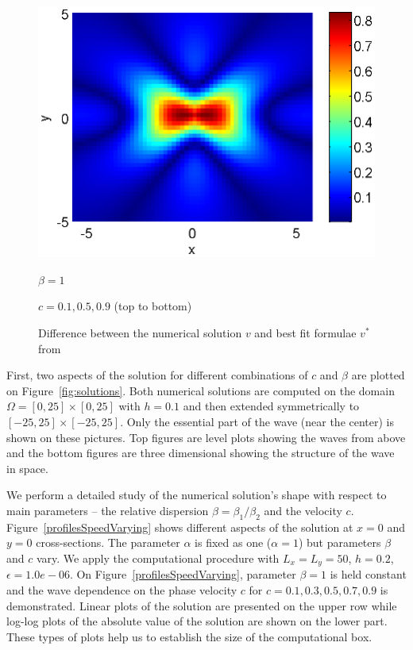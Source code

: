 \documentclass[leqno,11pt]{book}
\begin{document}
\begin{figure}[htbp]
\begin{minipage}[b]{0.48\linewidth}
		 \includegraphics[width=\linewidth]{differences/difference_c=09_beta=1.eps}
		\centerline{$\beta = 1$}
		\centerline{$c = 0.1, 0.5, 0.9$ (top to bottom)}
	\end{minipage}
	\caption{Difference between the numerical solution $v$ and best fit  formulae $v^*$ from \cite{Ch2011} }
	\label{fig:difference}
\end{figure}

First, two aspects of the solution for different combinations of  $c$ and $\beta$   are plotted  on Figure~\ref{fig:solutions}. Both numerical solutions are computed on the  domain $\Omega = [0, 25]\times [0, 25]$ with $h = 0.1$ and then extended symmetrically to $ [-25, 25]\times [-25, 25]$. 
Only the essential part of the wave (near the center) is shown on these pictures. Top figures are level plots showing the waves from above and the bottom figures are 
three dimensional showing the structure of the wave in space. 



We perform a detailed study   of the numerical solution's shape with respect to main parameters -- the relative dispersion $\beta=\beta_1 / \beta_2$ and the velocity $c$.
 Figure~\ref{profilesSpeedVarying} shows different aspects of the solution at $x=0$ and $y=0$ cross-sections. The parameter $\alpha$  is fixed as one ($\alpha = 1$) but  parameters $\beta $ and $c$ vary. We apply  the computational procedure with  $L_x = L_y = 50$, $h = 0.2$, $\epsilon = 1.0e-06$. 
On Figure~\ref{profilesSpeedVarying}, parameter $\beta=1$ is held constant and the wave dependence on the phase velocity  $c$ for $c=0.1, 0.3, 0.5, 0.7, 0.9$ is demonstrated.  Linear plots of the solution are presented on the upper row while  log-log plots of the absolute value of the solution are shown on the lower part.  These types of plots help us to establish the size of the computational box. 
\end{document}
